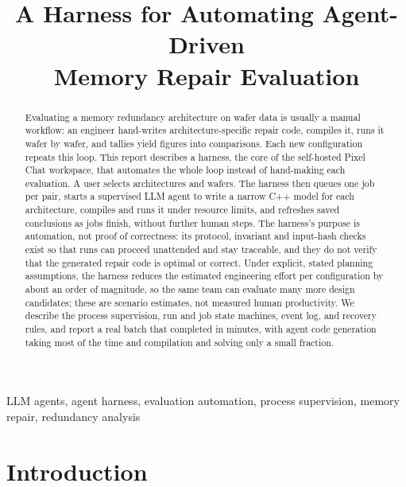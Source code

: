 \documentclass[conference]{IEEEtran}
\begin{document}
\title{A Harness for Automating Agent-Driven\\Memory Repair Evaluation}

\author{
}

\maketitle

\begin{abstract}
Evaluating a memory redundancy architecture on wafer data is usually a
manual workflow: an engineer hand-writes architecture-specific repair code,
compiles it, runs it wafer by wafer, and tallies yield figures into
comparisons. Each new configuration repeats this loop. This report
describes a harness, the core of the self-hosted Pixel Chat workspace,
that automates the whole loop instead of hand-making each evaluation. A
user selects architectures and wafers. The harness then queues one job per
pair, starts a supervised LLM agent to write a narrow C++ model for each
architecture, compiles and runs it under resource limits, and refreshes
saved conclusions as jobs finish, without further human steps. The
harness's purpose is automation, not proof of correctness: its protocol,
invariant and input-hash checks exist so that runs can proceed unattended
and stay traceable, and they do not verify that the generated repair code
is optimal or correct. Under explicit, stated planning assumptions, the
harness reduces the estimated engineering effort per configuration by about
an order of magnitude, so the same team can evaluate many more design
candidates; these are scenario estimates, not measured human productivity.
We describe the process supervision, run and job state machines, event
log, and recovery rules, and report a real batch that completed in minutes,
with agent code generation taking most of the time and compilation and
solving only a small fraction.
\end{abstract}

\begin{IEEEkeywords}
LLM agents, agent harness, evaluation automation, process supervision, memory repair, redundancy analysis
\end{IEEEkeywords}

\section{Introduction}
\end{document}
